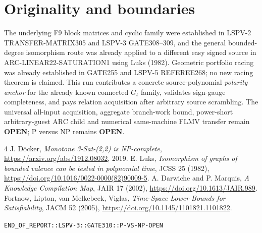 \documentclass[11pt]{article}
\begin{document}
\section{Originality and boundaries}
The underlying F9 block matrices and cyclic family were established in LSPV-2 TRANSFER-MATRIX305 and LSPV-3 GATE308--309, and the general bounded-degree isomorphism route was already applied to a different easy signed source in ARC-LINEAR22-SATURATION1 using Luks (1982). Geometric portfolio racing was already established in GATE255 and LSPV-5 REFEREE268; no new racing theorem is claimed. This run contributes a concrete source-polynomial \emph{polarity anchor} for the already known connected $G_t$ family, validates sign-gauge completeness, and pays relation acquisition after arbitrary source scrambling. The universal all-input acquisition, aggregate branch-work bound, power-short arbitrary-guest ARC child and numerical same-machine FLMV transfer remain \textbf{OPEN}; P versus NP remains \textbf{OPEN}.
\begin{thebibliography}{4}
 J. D\"ocker, \emph{Monotone 3-Sat-(2,2) is NP-complete}, \url{https://arxiv.org/abs/1912.08032}, 2019.
 E. Luks, \emph{Isomorphism of graphs of bounded valence can be tested in polynomial time}, JCSS 25 (1982), \url{https://doi.org/10.1016/0022-0000(82)90009-5}.
 A. Darwiche and P. Marquis, \emph{A Knowledge Compilation Map}, JAIR 17 (2002), \url{https://doi.org/10.1613/JAIR.989}.
 Fortnow, Lipton, van Melkebeek, Viglas, \emph{Time-Space Lower Bounds for Satisfiability}, JACM 52 (2005), \url{https://doi.org/10.1145/1101821.1101822}.
\end{thebibliography}
\noindent\texttt{END\_OF\_REPORT::LSPV-3::GATE310::P-VS-NP-OPEN}
\end{document}
